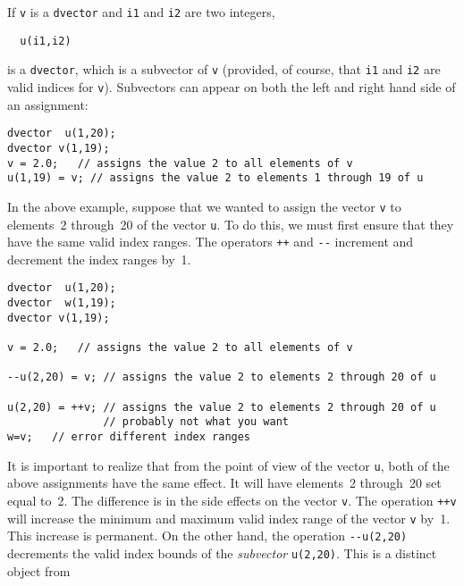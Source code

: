 If \texttt{v} is a \texttt{dvector} and \texttt{i1} and \texttt{i2} are two integers,
\begin{lstlisting}
  u(i1,i2)
\end{lstlisting}
is a \texttt{dvector}, which is a subvector of \texttt{v} (provided, of
course, that \texttt{i1} and \texttt{i2} are valid indices for \texttt{v}). Subvectors
can appear on both the left and right hand side of an assignment:
\begin{lstlisting}
dvector  u(1,20);
dvector v(1,19);
v = 2.0;   // assigns the value 2 to all elements of v
u(1,19) = v; // assigns the value 2 to elements 1 through 19 of u
\end{lstlisting}
In the above example, suppose that we wanted to assign the vector \texttt{v}
to elements~2 through~20 of the vector \texttt{u}. To do this, we must first ensure that
they have the same valid index ranges. The operators \texttt{++} and \texttt{-{}-}
increment and decrement the index ranges by~1.
\begin{lstlisting}
dvector  u(1,20);
dvector  w(1,19);
dvector v(1,19);

v = 2.0;   // assigns the value 2 to all elements of v

--u(2,20) = v; // assigns the value 2 to elements 2 through 20 of u

u(2,20) = ++v; // assigns the value 2 to elements 2 through 20 of u
               // probably not what you want
w=v;   // error different index ranges
\end{lstlisting}
It is important to realize that from the point of view of the vector
\texttt{u}, both of the above assignments have the same effect. It will have
elements~2 through~20 set equal to~2. The difference is in the side
effects on the vector \texttt{v}. The operation \texttt{++v}
will increase the minimum and maximum valid index range of the vector 
\texttt{v} by~1. This increase is permanent. On the other hand,
the operation \texttt{-{}-u(2,20)} decrements the valid index bounds of
the {\it subvector} \texttt{u(2,20)}. This is a distinct object from
